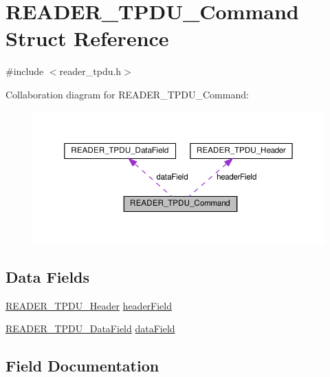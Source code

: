 \hypertarget{struct_r_e_a_d_e_r___t_p_d_u___command}{}\section{R\+E\+A\+D\+E\+R\+\_\+\+T\+P\+D\+U\+\_\+\+Command Struct Reference}
\label{struct_r_e_a_d_e_r___t_p_d_u___command}


{\ttfamily \#include $<$reader\+\_\+tpdu.\+h$>$}



Collaboration diagram for R\+E\+A\+D\+E\+R\+\_\+\+T\+P\+D\+U\+\_\+\+Command\+:
\nopagebreak
\begin{figure}[H]
\begin{center}
\leavevmode
\includegraphics[width=350pt]{struct_r_e_a_d_e_r___t_p_d_u___command__coll__graph}
\end{center}
\end{figure}
\subsection*{Data Fields}
\begin{DoxyCompactItemize}
\item 
\hyperlink{struct_r_e_a_d_e_r___t_p_d_u___header}{R\+E\+A\+D\+E\+R\+\_\+\+T\+P\+D\+U\+\_\+\+Header} \hyperlink{struct_r_e_a_d_e_r___t_p_d_u___command_a03160376b918660c9a47dfc9eeb440f7}{header\+Field}
\item 
\hyperlink{struct_r_e_a_d_e_r___t_p_d_u___data_field}{R\+E\+A\+D\+E\+R\+\_\+\+T\+P\+D\+U\+\_\+\+Data\+Field} \hyperlink{struct_r_e_a_d_e_r___t_p_d_u___command_acbe7f6ca9b7edb9642288240559a2c2b}{data\+Field}
\end{DoxyCompactItemize}


\subsection{Field Documentation}
\mbox{\label{struct_r_e_a_d_e_r___t_p_d_u___command_acbe7f6ca9b7edb9642288240559a2c2b}} 
